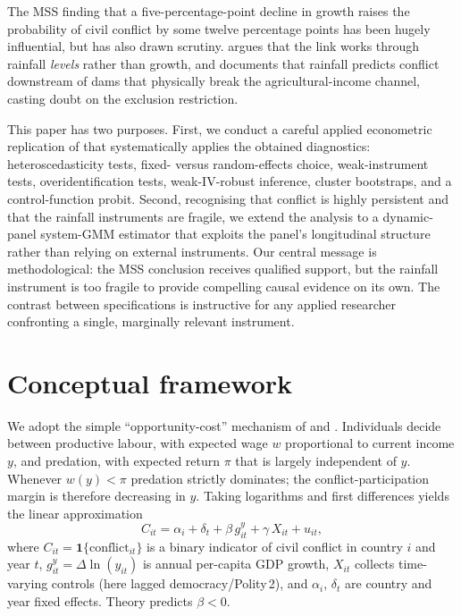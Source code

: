 \documentclass[11pt,a4paper]{article}
\begin{document}
The MSS finding that a five-percentage-point decline in growth raises
the probability of civil conflict by some twelve percentage
points has been hugely influential, but has also drawn scrutiny.
\citet{Ciccone2011} argues that the link works through rainfall
\emph{levels} rather than growth, and \citet{Sarsons2015} documents
that rainfall predicts conflict downstream of dams that physically
break the agricultural-income channel, casting doubt on the
exclusion restriction.

This paper has two purposes. First, we conduct a careful applied
econometric replication of \citet{MSS2004} that systematically
applies the obtained diagnostics: heteroscedasticity tests, fixed- versus random-effects
choice, weak-instrument tests, overidentification tests,
weak-IV-robust inference, cluster bootstraps, and a control-function
probit. Second, recognising that conflict is highly persistent and
that the rainfall instruments are fragile, we extend the analysis
to a dynamic-panel system-GMM estimator
\citep{ArellanoBond1991,BlundellBond1998} that exploits the panel's
longitudinal structure rather than relying on external instruments.
Our central message is methodological: the MSS conclusion receives
qualified support, but the rainfall instrument is too fragile to
provide compelling causal evidence on its own. The contrast between
specifications is instructive for any applied researcher confronting
a single, marginally relevant instrument.

\section{Conceptual framework}\label{sec:concept}
We adopt the simple ``opportunity-cost'' mechanism of
\citet{Grossman1991} and \citet{ChassangPadroMiquel2009}.
Individuals decide between productive labour, with expected wage $w$
proportional to current income $y$, and predation, with expected
return $\pi$ that is largely independent of $y$. Whenever
$w(y)<\pi$ predation strictly dominates; the conflict-participation
margin is therefore decreasing in $y$. Taking logarithms and first
differences yields the linear approximation
\begin{equation}\label{eq:struct}
   C_{it} = \alpha_i + \delta_t + \beta\, g^{y}_{it}
            + \gamma\,X_{it} + u_{it},
\end{equation}
where $C_{it}=\mathbf{1}\{\text{conflict}_{it}\}$ is a binary
indicator of civil conflict in country $i$ and year $t$,
$g^{y}_{it}=\Delta\ln(y_{it})$ is annual per-capita GDP growth,
$X_{it}$ collects time-varying controls (here lagged
democracy/Polity\,2), and $\alpha_i$, $\delta_t$ are country and
year fixed effects. Theory predicts $\beta<0$.
\end{document}
